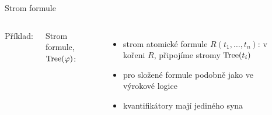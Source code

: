 \documentclass{beamer}
\begin{document}
\begin{frame}{Strom formule}

    \begin{columns}
        

        Příklad: 

        \bigskip

        \alert{Strom formule}, \alert{$\operatorname{Tree}(\varphi)$}:
        
        \begin{itemize}
            \item strom atomické formule $R(t_1,\dots,t_n)$: v kořeni $R$, připojíme stromy $\operatorname{Tree}(t_i)$
            \item pro složené formule podobně jako ve výrokové logice
            \item kvantifikátory mají jediného syna
        \end{itemize}

        \vspace{1.5cm}


        \begin{center}
        \end{center}

    \end{columns}

\end{frame}
\end{document}
